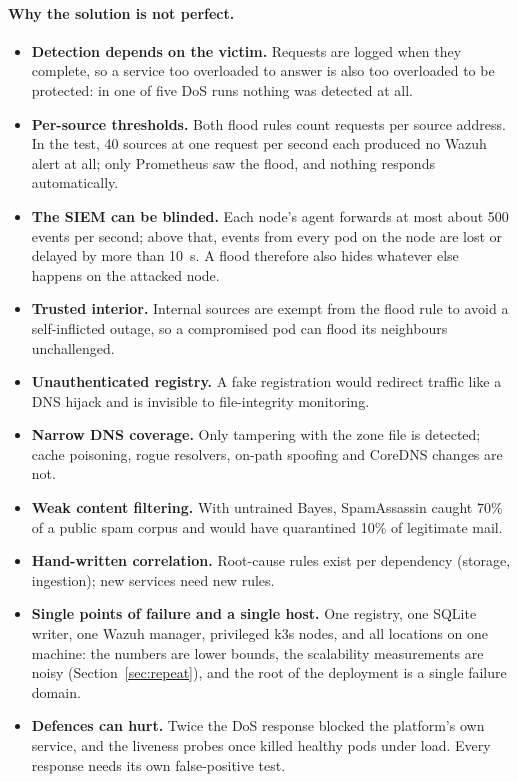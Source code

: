 \paragraph{Why the solution is not perfect.}
\begin{itemize}
  \item \textbf{Detection depends on the victim.} Requests are logged when they complete, so a
        service too overloaded to answer is also too overloaded to be protected: in one of five
        DoS runs nothing was detected at all.
  \item \textbf{Per-source thresholds.} Both flood rules count requests per source address. In the
        test, 40 sources at one request per second each produced no Wazuh alert at all; only
        Prometheus saw the flood, and nothing responds automatically.
  \item \textbf{The SIEM can be blinded.} Each node's agent forwards at most about 500 events per
        second; above that, events from every pod on the node are lost or delayed by more than
        10~s. A flood therefore also hides whatever else happens on the attacked node.
  \item \textbf{Trusted interior.} Internal sources are exempt from the flood rule to avoid a
        self-inflicted outage, so a compromised pod can flood its neighbours unchallenged.
  \item \textbf{Unauthenticated registry.} A fake registration would redirect traffic like a DNS
        hijack and is invisible to file-integrity monitoring.
  \item \textbf{Narrow DNS coverage.} Only tampering with the zone file is detected; cache
        poisoning, rogue resolvers, on-path spoofing and CoreDNS changes are not.
  \item \textbf{Weak content filtering.} With untrained Bayes, SpamAssassin caught 70\% of a public
        spam corpus and would have quarantined 10\% of legitimate mail.
  \item \textbf{Hand-written correlation.} Root-cause rules exist per dependency (storage,
        ingestion); new services need new rules.
  \item \textbf{Single points of failure and a single host.} One registry, one SQLite writer, one
        Wazuh manager, privileged k3s nodes, and all locations on one machine: the numbers are lower
        bounds, the scalability measurements are noisy (Section~\ref{sec:repeat}), and the root of
        the deployment is a single failure domain.
  \item \textbf{Defences can hurt.} Twice the DoS response blocked the platform's own service, and the liveness
        probes once killed healthy pods under load. Every response needs its own false-positive
        test.
\end{itemize}

